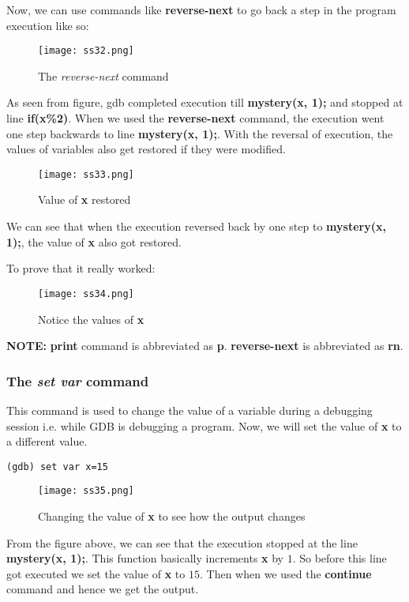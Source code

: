 \documentclass{article}
\makeatletter
\renewcommand\paragraph{\@startsection{paragraph}{4}{\z@}{-3.25ex \@plus -1ex \@minus -.2ex}{1.5ex \@plus .2ex}{\normalfont\normalsize\bfseries}}
\makeatother
\begin{document}
Now, we can use commands like \textbf{reverse-next} to go back a step in the program execution like so:

\begin{figure}[h]
\centering
\texttt{[image: ss32.png]}
\caption{The \textit{reverse-next} command}
\end{figure}

As seen from figure, gdb completed execution till \textbf{mystery(x, 1);} and stopped at line \textbf{if(x\%2)}. When we used the \textbf{reverse-next} command, the execution went one step backwards to line \textbf{mystery(x, 1);}. With the reversal of execution, the values of variables also get restored if they were modified.

\begin{figure}[h]
\centering
\texttt{[image: ss33.png]}
\caption{Value of \textbf{x} restored}
\end{figure}

We can see that when the execution reversed back by one step to \textbf{mystery(x, 1);}, the value of \textbf{x} also got restored.

\newpage
To prove that it really worked:
\begin{figure}[h]
\centering
\texttt{[image: ss34.png]}
\caption{Notice the values of \textbf{x}}
\end{figure}

\textbf{NOTE:} \textbf{print} command is abbreviated as \textbf{p}. \textbf{reverse-next} is abbreviated as \textbf{rn}.

\subsubsection{The \textit{set var} command}
\paragraph{}
This command is used to change the value of a variable during a debugging session i.e. while GDB is debugging a program.
\newpage
Now, we will set the value of \textbf{x} to a different value.

\begin{Verbatim}[frame=single]
(gdb) set var x=15
\end{Verbatim}

\begin{figure}[h]
\centering
\texttt{[image: ss35.png]}
\caption{Changing the value of \textbf{x} to see how the output changes}
\end{figure}

From the figure above, we can see that the execution stopped at the line \textbf{mystery(x, 1);}. This function basically increments \textbf{x} by $1$. So before this line got executed we set the value of \textbf{x} to $15$. Then when we used the \textbf{continue} command and hence we get the output.
\end{document}
